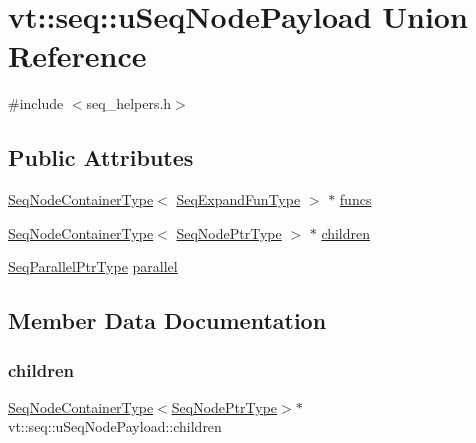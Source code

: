 \hypertarget{unionvt_1_1seq_1_1u_seq_node_payload}{}\section{vt\+:\+:seq\+:\+:u\+Seq\+Node\+Payload Union Reference}
\label{unionvt_1_1seq_1_1u_seq_node_payload}


{\ttfamily \#include $<$seq\+\_\+helpers.\+h$>$}

\subsection*{Public Attributes}
\begin{DoxyCompactItemize}
\item 
\hyperlink{namespacevt_1_1seq_ad2b106b952becc168d3c567411ebf899}{Seq\+Node\+Container\+Type}$<$ \hyperlink{namespacevt_1_1seq_ab345c700c06d135cafba39f711767ad5}{Seq\+Expand\+Fun\+Type} $>$ $\ast$ \hyperlink{unionvt_1_1seq_1_1u_seq_node_payload_ae29c56313f829840c64f9712fd457f5e}{funcs}
\item 
\hyperlink{namespacevt_1_1seq_ad2b106b952becc168d3c567411ebf899}{Seq\+Node\+Container\+Type}$<$ \hyperlink{namespacevt_1_1seq_ae6a4874b585be0612aaca32ca6d2d191}{Seq\+Node\+Ptr\+Type} $>$ $\ast$ \hyperlink{unionvt_1_1seq_1_1u_seq_node_payload_a5bb3768b1f46e996b61b460b6b4a66d2}{children}
\item 
\hyperlink{namespacevt_1_1seq_a050106112a0717f8e482465957fb2bfe}{Seq\+Parallel\+Ptr\+Type} \hyperlink{unionvt_1_1seq_1_1u_seq_node_payload_a82cfe4fb82709cc917dc36a41446d491}{parallel}
\end{DoxyCompactItemize}


\subsection{Member Data Documentation}
\mbox{\label{unionvt_1_1seq_1_1u_seq_node_payload_a5bb3768b1f46e996b61b460b6b4a66d2}} 
\subsubsection{\texorpdfstring{children}{children}}
{\footnotesize\ttfamily \hyperlink{namespacevt_1_1seq_ad2b106b952becc168d3c567411ebf899}{Seq\+Node\+Container\+Type}$<$\hyperlink{namespacevt_1_1seq_ae6a4874b585be0612aaca32ca6d2d191}{Seq\+Node\+Ptr\+Type}$>$$\ast$ vt\+::seq\+::u\+Seq\+Node\+Payload\+::children}

